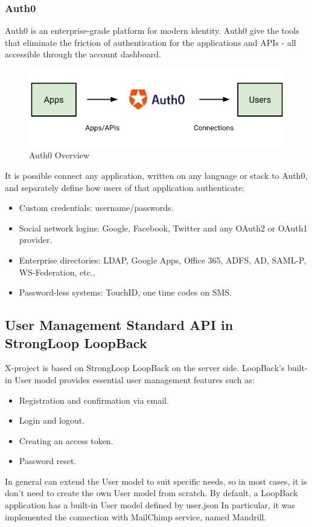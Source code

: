 \subsubsection{Auth0}

Auth0 is an enterprise-grade platform for modern identity.
Auth0 give the tools that eliminate the friction of authentication for the applications and APIs - all accessible through the account dashboard.\cite{usr_auth0}

\begin {figure}[h]
\graphicspath{{images/chapter_USR/}}
\includegraphics[width=\textwidth]{auth0}
\caption{Auth0 Overview}
\end {figure}

It is possible connect any application, written on any language or stack to Auth0, and separately define how users of that application authenticate:

\begin{itemize}
\item Custom credentials: username/passwords.
\item Social network logins: Google, Facebook, Twitter and any OAuth2 or OAuth1 provider.
\item Enterprise directories: LDAP, Google Apps, Office 365, ADFS, AD, SAML-P, WS-Federation, etc.,
\item Password-less systems: TouchID, one time codes on SMS.
\end{itemize}


\subsection{User Management Standard API in StrongLoop LoopBack}

X-project is based on StrongLoop LoopBack on the server side.
LoopBack's built-in User model provides essential user management features such as:
\begin{itemize}
\item Registration and confirmation via email.
\item Login and logout.
\item Creating an access token.
\item Password reset. 
\end{itemize}
In general can extend the User model to suit specific needs, so in most cases, it is don't need to create the own User model from scratch.
By default, a LoopBack application has a built-in User model defined by user.json
In particular, it was implemented the connection with MailChimp service, named Mandrill.

